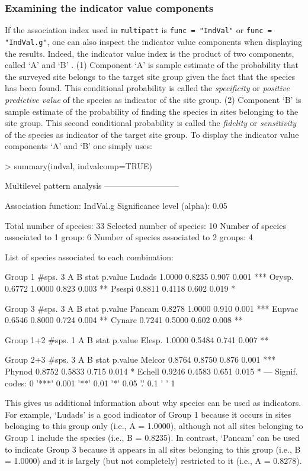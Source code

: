 \documentclass[11pt,a4paper]{article}
\begin{document}
\subsubsection{Examining the indicator value components}
If the association index used in \texttt{multipatt} is \texttt{func = "IndVal"} or \texttt{func = "IndVal.g"}, one can also inspect the indicator value components when displaying the results. Indeed, the indicator value index is the product of two components, called `A' and `B' \citep{Dufrene1997}\citep{DeCaceres2009}. (1) Component `A' is sample estimate of the probability that the surveyed site belongs to the target site group given the fact that the species has been found. This conditional probability is called the \emph{specificity} or \emph{positive predictive value} of the species as indicator of the site group. (2) Component `B' is sample estimate of the probability of finding the species in sites belonging to the site group. This second conditional probability is called the \emph{fidelity} or \emph{sensitivity} of the species as indicator of the target site group. To display the indicator value components `A' and `B' one simply uses:
\begin{Schunk}
\begin{Sinput}
> summary(indval, indvalcomp=TRUE)
\end{Sinput}
\begin{Soutput}
 Multilevel pattern analysis
 ---------------------------

 Association function: IndVal.g
 Significance level (alpha): 0.05

 Total number of species: 33
 Selected number of species: 10 
 Number of species associated to 1 group: 6 
 Number of species associated to 2 groups: 4 

 List of species associated to each combination: 

 Group 1  #sps.  3 
            A      B  stat p.value    
Ludads 1.0000 0.8235 0.907   0.001 ***
Orysp. 0.6772 1.0000 0.823   0.003 ** 
Psespi 0.8811 0.4118 0.602   0.019 *  

 Group 3  #sps.  3 
            A      B  stat p.value    
Pancam 0.8278 1.0000 0.910   0.001 ***
Eupvac 0.6546 0.8000 0.724   0.004 ** 
Cynarc 0.7241 0.5000 0.602   0.008 ** 

 Group 1+2  #sps.  1 
            A      B  stat p.value   
Elesp. 1.0000 0.5484 0.741   0.007 **

 Group 2+3  #sps.  3 
            A      B  stat p.value    
Melcor 0.8764 0.8750 0.876   0.001 ***
Phynod 0.8752 0.5833 0.715   0.014 *  
Echell 0.9246 0.4583 0.651   0.015 *  
---
Signif. codes:  0 '***' 0.001 '**' 0.01 '*' 0.05 '.' 0.1 ' ' 1 
\end{Soutput}
\end{Schunk}
This gives us additional information about why species can be used as indicators. For example, `Ludads' is a good indicator of Group 1 because it occurs in sites belonging to this group only (i.e., A = 1.0000), although not all sites belonging to Group 1 include the species (i.e., B = 0.8235). In contrast, `Pancam' can be used to indicate Group 3 because it appears in all sites belonging to this group (i.e., B = 1.0000) and it is largely (but not completely) restricted to it (i.e., A = 0.8278).
\end{document}
